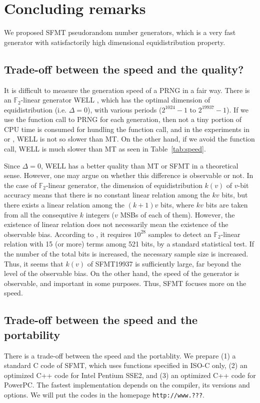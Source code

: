 \documentclass[acmnow]{acmtrans2m}
\def\F2{{\mathbb F}_2}
\begin{document}
\section{Concluding remarks}
We proposed SFMT pseudorandom number generators, 
which is a very fast generator with satisfactorily
high dimensional equidistribution property. 

\subsection{Trade-off between the speed and the quality?}
It is difficult to measure the generation speed of a PRNG in a fair way. 
There is an $\F2$-linear generator 
WELL \cite{WELL}, which has the optimal dimension of 
equidistribution (i.e. $\Delta=0$), 
with various periods ($2^{1024}-1$ to $2^{19937}-1$).
If we use the function call to PRNG
for each generation, then not a tiny portion of CPU time
is consumed for hundling the function call, and in the 
experiments in \cite{WELL} or \cite{XORSHIFT}, WELL 
is not so slower than MT. On the other hand, if we avoid
the function call, WELL is much slower than MT as seen
in Table~\ref{tab:speed}. 

Since $\Delta=0$, WELL has a better quality than MT or SFMT
in a theoretical sense. 
However, one may argue on whether this difference is 
observable or not. In the case of $\F2$-linear generator,
the dimension of equidistribution $k(v)$ of $v$-bit accuracy
means that
there is no constant linear relation among the 
$kv$ bits, but there exists a linear relation among
the $(k+1)v$ bits, where $kv$ bits are taken from
all the consequtive $k$ integers ($v$ MSBs of each of them). 
However, the existence of linear relation does not necessarily
mean the existence of the observable bias.
According to \cite{TESTWEIGHT}, it requires $10^{28}$
samples to detect an $\F2$-linear relation with 
15 (or more) terms among 521 bits, by a standard
statistical test. If the number of the 
total bits is increased, 
the necessary sample size is increased. Thus, it seems
that $k(v)$ of SFMT19937 is sufficiently large, far beyond
the level of the observable bias. 
On the other hand, the speed of the generator is 
observable, and important in some purposes. 
Thus, SFMT focuses more on the speed. 

\subsection{Trade-off between the speed and the portability}
There is a trade-off between the speed and the portablity.
We prepare (1) a standard C code of SFMT, which uses 
functions specified in ISO-C only, (2) an optimized C++ code for
Intel Pentium SSE2, and (3) an optimized C++ code for PowerPC. 
The fastest implementation depends on the compiler, its versions and
options. We will put the codes in the homepage {\tt http://www.???}.
\end{document}
